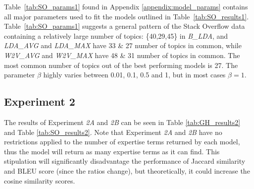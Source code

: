             Table~\ref{tab:SO_params1} found in Appendix \ref{appendix:model_params} contains all major parameters used to fit the models outlined in Table~\ref{tab:SO_results1}. Table~\ref{tab:SO_params1} suggests a general pattern of the Stack Overflow data containing a relatively large number of topics: \{40,29,45\} in  \emph{B\_LDA}, and \emph{LDA\_AVG} and \emph{LDA\_MAX} have 33 \& 27 number of topics in common, while \emph{W2V\_AVG} and \emph{W2V\_MAX} have 48 \& 31 number of topics in common. The most common number of topics out of the best performing models is 27. The parameter $\beta$ highly varies between 0.01, 0.1, 0.5 and 1, but in most cases $\beta=1$.
        
        \subsection{Experiment 2}
            The results of Experiment \emph{2A} and \emph{2B} can be seen in Table \ref{tab:GH_results2} and Table \ref{tab:SO_results2}. Note that Experiment \emph{2A} and \emph{2B} have no restrictions applied to the number of expertise terms returned by each model, thus the model will return as many expertise terms as it can find. This stipulation will significantly disadvantage the performance of Jaccard similarity and BLEU score (since the ratios change), but theoretically, it could increase the cosine similarity scores. 
            
